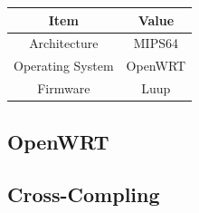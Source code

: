 \begin{center}
  \begin{tabular}{@{} cc @{}}
    \toprule
    Item & Value \\
    \midrule
    Architecture & MIPS64 \\
    Operating System & OpenWRT \\
    Firmware & Luup \\
    \bottomrule
  \end{tabular}
\end{center}
\subsection{OpenWRT}
\subsection{Cross-Compling}
